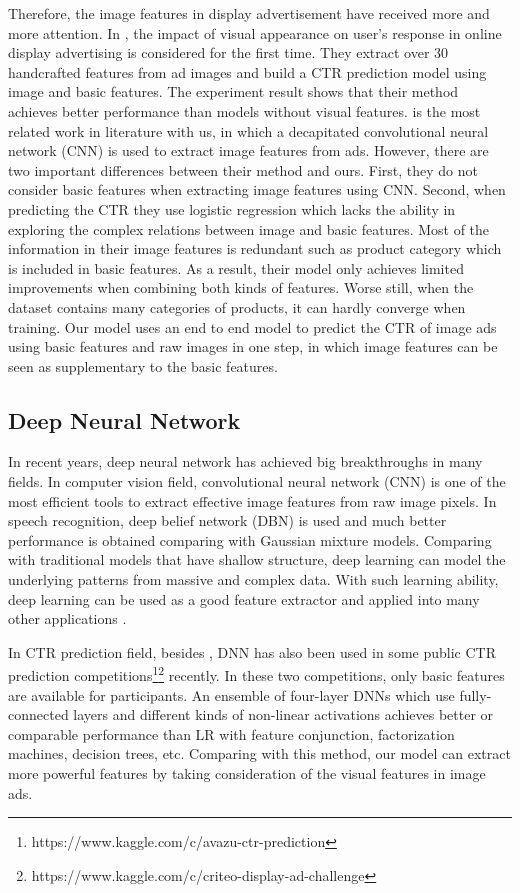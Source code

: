 \documentclass{sig-alternate}
\begin{document}
Therefore, the image features in display advertisement have received more and more attention. In \cite{azimi2012impact,cheng2012multimedia}, the impact of  visual appearance  on user's response in online display advertising is considered for the first time. They extract over 30 handcrafted features from ad images and build a CTR prediction model using image and basic  features. The experiment result shows that their method achieves better performance than models without visual features.   \cite{Mo:2015:IFL:2832747.2832769} is the most related work  in literature with us, in which a decapitated convolutional neural network (CNN) is used to extract image features from ads. However, there are two important differences between their method and ours.   First, they do not consider basic features when extracting image features using CNN. Second,  when predicting the CTR they  use logistic regression which lacks the ability in exploring the complex relations between image and basic features. Most of the information in their image features is redundant  such as product category which is included in basic features. As a result, their model only achieves limited improvements when combining both kinds of features. Worse still, when the dataset contains many categories of products, it can hardly converge when training. Our model uses an end to end model to predict the CTR of image ads using basic features and raw images in one step, in which image features can be seen as  supplementary to the basic features.
\subsection{Deep Neural Network} 
In recent years, deep neural network has achieved big breakthroughs in many fields. In computer vision field, convolutional neural network (CNN) \cite{NIPS2012_4824} is one of the most efficient tools to extract effective image features from raw image pixels.  In speech recognition, deep belief network (DBN) \cite{hinton2012deep} is used and much better performance is obtained comparing with Gaussian mixture models. Comparing with traditional models that have shallow structure, deep learning can model the underlying patterns  from massive and complex data. With such learning ability, deep learning can be used as a good feature extractor and applied into many other applications \cite{ren2015faster,simonyan2014two}.

In CTR prediction field, besides \cite{zhang2016deep}, DNN has also been used in some public CTR prediction  competitions\footnote{https://www.kaggle.com/c/avazu-ctr-prediction}\footnote{https://www.kaggle.com/c/criteo-display-ad-challenge} recently. In these two competitions, only basic features are available for participants. An ensemble of four-layer DNNs which use fully-connected layers and different kinds of non-linear activations  achieves better or comparable performance than LR with feature conjunction, factorization machines, decision trees, etc. Comparing with this method, our model can extract more powerful features by taking consideration  of the visual features in image ads. 
\end{document}
